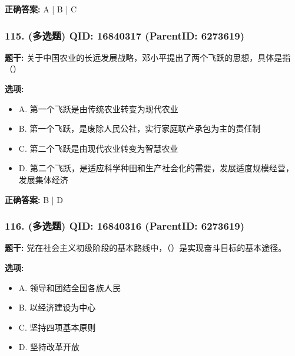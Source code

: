 \documentclass[12pt,UTF8]{ctexart}
\begin{document}
\textbf{正确答案:}
A | B | C

\vspace{0.3em}\hrulefill\vspace{0.7em}

\subsubsection*{115. (多选题) \small QID: 16840317 (ParentID: 6273619)}

\textbf{题干:}
关于中国农业的长远发展战略，邓小平提出了两个飞跃的思想，具体是指（）



\textbf{选项:}
\begin{itemize}[leftmargin=*]

  \item A. 第一个飞跃是由传统农业转变为现代农业

  \item B. 第一个飞跃，是废除人民公社，实行家庭联产承包为主的责任制

  \item C. 第二个飞跃是由现代农业转变为智慧农业

  \item D. 第二个飞跃，是适应科学种田和生产社会化的需要，发展适度规模经营，发展集体经济

\end{itemize}

\textbf{正确答案:}
B | D

\vspace{0.3em}\hrulefill\vspace{0.7em}

\subsubsection*{116. (多选题) \small QID: 16840316 (ParentID: 6273619)}

\textbf{题干:}
党在社会主义初级阶段的基本路线中，（）是实现奋斗目标的基本途径。



\textbf{选项:}
\begin{itemize}[leftmargin=*]

  \item A. 领导和团结全国各族人民

  \item B. 以经济建设为中心

  \item C. 坚持四项基本原则

  \item D. 坚持改革开放

\end{itemize}
\end{document}
